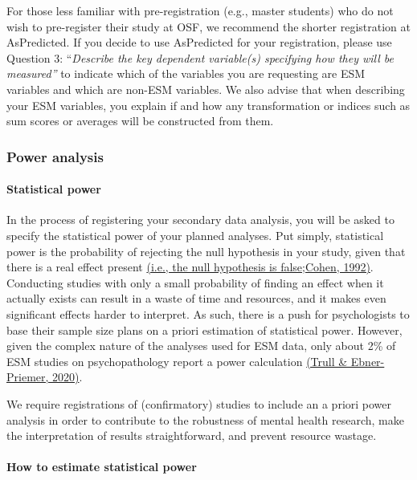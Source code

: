 \documentclass[
]{article}
\begin{document}
For those less familiar with pre-registration (e.g., master students)
who do not wish to pre-register their study at OSF, we recommend the
shorter registration at AsPredicted. If you decide to use AsPredicted
for your registration, please use Question 3: ``\emph{Describe the key
dependent variable(s) specifying how they will be measured''} to
indicate which of the variables you are requesting are ESM variables and
which are non-ESM variables. We also advise that when describing your
ESM variables, you explain if and how any transformation or indices such
as sum scores or averages will be constructed from them.

\hypertarget{power-analysis}{%
\subsubsection{Power analysis}\label{power-analysis}}

\hypertarget{statistical-power}{%
\paragraph{Statistical power}\label{statistical-power}}

In the process of registering your secondary data analysis, you will be
asked to specify the statistical power of your planned analyses. Put
simply, statistical power is the probability of rejecting the null
hypothesis in your study, given that there is a real effect present
\href{https://www.zotero.org/google-docs/?xgNmjx}{(i.e., the null
hypothesis is
false}\href{https://www.zotero.org/google-docs/?xgNmjx}{;}\href{https://www.zotero.org/google-docs/?xgNmjx}{Cohen,
1992)}. Conducting studies with only a small probability of finding an
effect when it actually exists can result in a waste of time and
resources, and it makes even significant effects harder to interpret. As
such, there is a push for psychologists to base their sample size plans
on a priori estimation of statistical power. However, given the complex
nature of the analyses used for ESM data, only about 2\% of ESM studies
on psychopathology report a power calculation
\href{https://www.zotero.org/google-docs/?eipiiN}{(Trull \&
Ebner-Priemer, 2020)}.

We require registrations of (confirmatory) studies to include an a
priori power analysis in order to contribute to the robustness of mental
health research, make the interpretation of results straightforward, and
prevent resource wastage.

\hypertarget{how-to-estimate-statistical-power}{%
\paragraph{How to estimate statistical
power}\label{how-to-estimate-statistical-power}}
\end{document}
